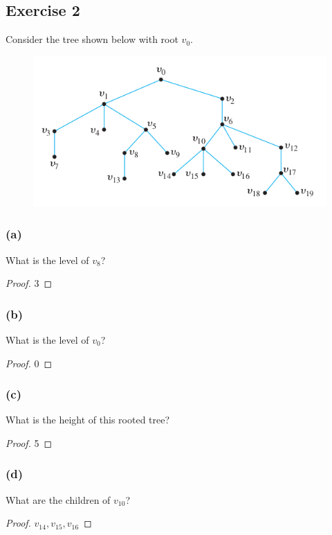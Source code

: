 \documentclass[14pt]{extarticle}
\begin{document}
\subsection{Exercise 2}
Consider the tree shown below with root \(v_0\).

\begin{figure}[ht!]
\centering
\includegraphics[scale=0.5]{../images/10.5.2.png}
\end{figure}

\subsubsection{(a)}
What is the level of \(v_8\)?
\begin{proof}
3
\end{proof}

\subsubsection{(b)}
What is the level of \(v_0\)?
\begin{proof}
0
\end{proof}

\subsubsection{(c)}
What is the height of this rooted tree?
\begin{proof}
5
\end{proof}

\subsubsection{(d)}
What are the children of \(v_{10}\)?
\begin{proof}
\(v_{14}, v_{15}, v_{16}\)
\end{proof}
\end{document}
